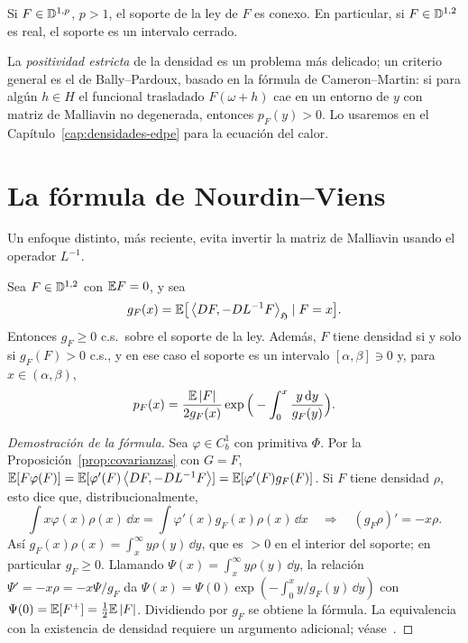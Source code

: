 \begin{teorema}
Si $F\in\mathbb{D}^{1,p}$, $p>1$, el soporte de la ley de $F$ es conexo.
En particular, si $F\in\mathbb{D}^{1,2}$ es real, el soporte es un intervalo cerrado.
\end{teorema}

La \emph{positividad estricta} de la densidad es un problema más delicado; un criterio general es el
de Bally--Pardoux, basado en la fórmula de Cameron--Martin: si para algún $h\in H$ el funcional
trasladado $F(\omega+h)$ cae en un entorno de $y$ con matriz de Malliavin no degenerada, entonces
$p_F(y)>0$. Lo usaremos en el Capítulo~\ref{cap:densidades-edpe} para la ecuación del calor.

\section{La fórmula de Nourdin--Viens}
Un enfoque distinto, más reciente, evita invertir la matriz de Malliavin usando el operador $L^{-1}$.

\begin{teorema}\label{teo:nourdin-viens}
Sea $F\in\mathbb{D}^{1,2}$ con $\mathbb{E} F=0$, y sea
\[
  g_F(x)=\mathbb{E}\big[\left\langle DF, -DL^{-1}F\right\rangle_{\mathfrak{H}}\mid F=x\big].
\]
Entonces $g_F\ge0$ c.s.\ sobre el soporte de la ley. Además, $F$ tiene densidad si y solo si
$g_F(F)>0$ c.s., y en ese caso el soporte es un intervalo $[\alpha,\beta]\ni0$ y, para $x\in(\alpha,\beta)$,
\[
  p_F(x)=\frac{\mathbb{E}\left\lvert F\right\rvert}{2g_F(x)}\exp\Big(-\int_0^x\frac{y\,\mathrm{d} y}{g_F(y)}\Big).
\]
\end{teorema}

\begin{proof}[Demostración de la fórmula]
Sea $\varphi\in C_b^1$ con primitiva $\Phi$. Por la Proposición~\ref{prop:covarianzas} con $G=F$,
$\mathbb{E}[F\varphi(F)]=\mathbb{E}[\varphi'(F)\left\langle DF, -DL^{-1}F\right\rangle]=\mathbb{E}[\varphi'(F)g_F(F)]$. Si $F$ tiene densidad $\rho$, esto dice que,
distribucionalmente,
\[
  \int x\varphi(x)\rho(x)\,\dd x=\int\varphi'(x)g_F(x)\rho(x)\,\dd x\quad\Longrightarrow\quad(g_F\rho)'=-x\rho.
\]
Así $g_F(x)\rho(x)=\int_x^\infty y\rho(y)\,\dd y$, que es $>0$ en el interior del soporte; en particular
$g_F\ge0$. Llamando $\Psi(x)=\int_x^\infty y\rho(y)\,\dd y$, la relación $\Psi'=-x\rho=-x\Psi/g_F$ da
$\Psi(x)=\Psi(0)\exp(-\int_0^xy/g_F(y)\,\dd y)$ con $\Psi(0)=\mathbb{E}[F^+]=\frac12\mathbb{E}\left\lvert F\right\rvert$. Dividiendo por $g_F$ se
obtiene la fórmula. La equivalencia con la existencia de densidad requiere un argumento
adicional; véase~\cite{NourdinViens09}.
\end{proof}

